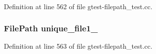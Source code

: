 \-Definition at line 562 of file gtest-\/filepath\-\_\-test.\-cc.

\hypertarget{gtest-filepath__test_8cc_a2a86ee575545592eb81059360eda7379}{
\subsubsection[{unique\-\_\-file1\-\_\-}]{\setlength{\rightskip}{0pt plus 5cm}\-File\-Path {\bf unique\-\_\-file1\-\_\-}}}\label{dc/d76/gtest-filepath__test_8cc_a2a86ee575545592eb81059360eda7379}


\-Definition at line 563 of file gtest-\/filepath\-\_\-test.\-cc.

